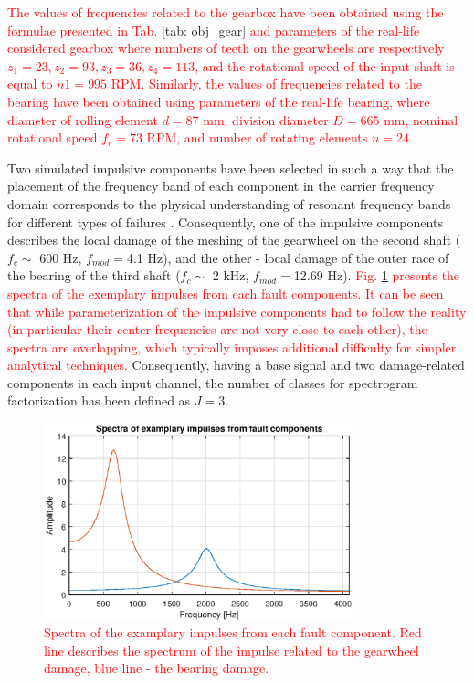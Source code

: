 \documentclass[3p,12pt]{elsarticle}
\begin{document}
\textcolor{red}{The values of frequencies related to the gearbox have been obtained using the formulae presented in Tab. \ref{tab: obj_gear} and parameters of the real-life considered gearbox where numbers of teeth on the gearwheels are respectively $z_1=23, z_2=93, z_3=36, z_4=113$, and the rotational speed of the input shaft is equal to $n1=995$ RPM.}
\textcolor{red}{Similarly, the values of frequencies related to the bearing have been obtained using parameters of the real-life bearing, where diameter of rolling element $d=87$ mm, division diameter $D=665$ mm, nominal rotational speed $f_r=73$ RPM, and number of rotating elements $n=24$.}

Two simulated impulsive components have been selected in such a way that the placement of the frequency band of each component in the carrier frequency domain corresponds to the physical understanding of resonant frequency bands for different types of failures \cite{bartelmus2010modelling}. Consequently, one of the impulsive components describes the local damage of the meshing of the gearwheel on the second shaft ($f_c\sim$ 600 Hz, $f_{mod}=$4.1 Hz), and the other - local damage of the outer race of the bearing of the third shaft ($f_c\sim$ 2 kHz, $f_{mod}=$12.69 Hz). \textcolor{red}{Fig. \ref{fig:imp_specs} presents the spectra of the exemplary impulses from each fault components. It can be seen that while parameterization of the impulsive components had to follow the reality (in particular their center frequencies are not very close to each other), the spectra are overlapping, which typically imposes additional difficulty for simpler analytical techniques.} Consequently, having a base signal and two damage-related components in each input channel, the number of classes for spectrogram factorization has been defined as $J=3$.

\begin{figure}[ht!]
\centering
\includegraphics[width=0.8\textwidth]{figs/specs.eps}
\caption{\textcolor{red}{Spectra of the examplary impulses from each fault component. Red line describes the spectrum of the impulse related to the gearwheel damage, blue line - the bearing damage.}}
\label{fig:imp_specs}
\end{figure}
\end{document}
